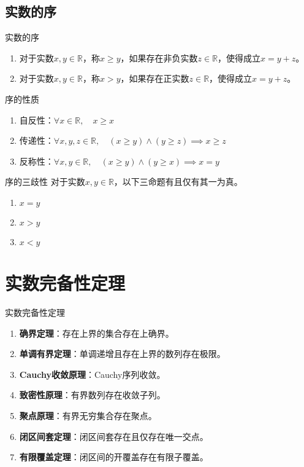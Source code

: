 \documentclass[lang = cn, scheme = chinese, thmcnt = section]{elegantbook}
\newcommand{\R}{\mathbb{R}}            %
\begin{document}
\subsection{实数的序}

\begin{definition}{实数的序}
	\begin{enumerate}
		\item 对于实数$x,y\in\R$，称$x \ge y$，如果存在非负实数$z\in\R$，使得成立$x=y+z$。
		\item 对于实数$x,y\in\R$，称$x > y$，如果存在正实数$z\in\R$，使得成立$x=y+z$。
	\end{enumerate}
\end{definition}

\begin{proposition}{序的性质}
	\begin{enumerate}
		\item 自反性：$\forall x\in\R,\quad x \ge x$
		\item 传递性：$\forall x,y,z\in\R,\quad (x\ge y)\wedge(y\ge z)\implies x\ge z$
		\item 反称性：$\forall x,y\in\R,\quad (x\ge y)\wedge(y\ge x)\implies x=y$
	\end{enumerate}
\end{proposition}

\begin{theorem}{序的三歧性}
	对于实数$x,y\in\R$，以下三命题有且仅有其一为真。
	\begin{enumerate}
		\item $x=y$
		\item $x>y$
		\item $x<y$
	\end{enumerate}
\end{theorem}

\section{实数完备性定理}

\begin{theorem}{实数完备性定理}
	\begin{enumerate}
		\item {\bf 确界定理}：存在上界的集合存在上确界。
		\item {\bf 单调有界定理}：单调递增且存在上界的数列存在极限。
		\item {\bf Cauchy收敛原理}：Cauchy序列收敛。
		\item {\bf 致密性原理}：有界数列存在收敛子列。
		\item {\bf 聚点原理}：有界无穷集合存在聚点。
		\item {\bf 闭区间套定理}：闭区间套存在且仅存在唯一交点。
		\item {\bf 有限覆盖定理}：闭区间的开覆盖存在有限子覆盖。
	\end{enumerate}
\end{theorem}
\end{document}
